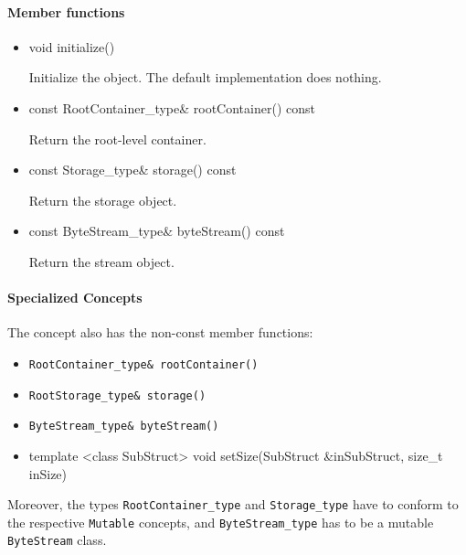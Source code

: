 \paragraph{Member functions}

\begin{itemize}
	\item
		\begin{cppsnippet}
		void initialize()
		\end{cppsnippet}

		Initialize the object. The default implementation does nothing.

	\item
		\begin{cppsnippet}
		const RootContainer_type& rootContainer() const
		\end{cppsnippet}
		
		Return the root-level container.

	\item
		\begin{cppsnippet}
		const Storage_type& storage() const
		\end{cppsnippet}
		
		Return the storage object.

	\item
		\begin{cppsnippet}
		const ByteStream_type& byteStream() const
		\end{cppsnippet}
		
		Return the stream object.
\end{itemize}

\paragraph{Specialized Concepts}

The concept  also has the non-const member functions:
\begin{itemize}
	\item \texttt{RootContainer\_type\& rootContainer()}
	\item \texttt{RootStorage\_type\& storage()}
	\item \texttt{ByteStream\_type\& byteStream()}
	\item
		\begin{cppsnippet}
		template <class SubStruct>
		void setSize(SubStruct &inSubStruct, size_t inSize)
		\end{cppsnippet}
\end{itemize}
%
Moreover, the types \texttt{RootContainer\_type} and \texttt{Storage\_type} have to conform to the respective \texttt{Mutable} concepts, and \texttt{ByteStream\_type} has to be a mutable \texttt{ByteStream} class.


